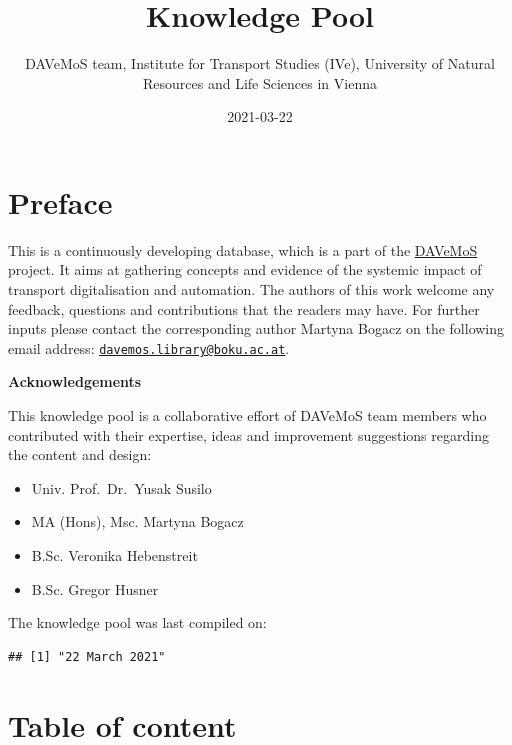 \documentclass[
]{book}
\title{Knowledge Pool}
\author{DAVeMoS team, Institute for Transport Studies (IVe), University of Natural Resources and Life Sciences in Vienna}
\date{2021-03-22}
\providecommand{\tightlist}{%
  \setlength{\itemsep}{0pt}\setlength{\parskip}{0pt}}
\begin{document}
\maketitle

{
\setcounter{tocdepth}{1}
\tableofcontents
}
\hypertarget{preface}{%
\chapter*{Preface}\label{preface}}

This is a continuously developing database, which is a part of the \href{https://www.davemos.online/}{DAVeMoS} project. It aims at gathering concepts and evidence of the systemic impact of transport digitalisation and automation. The authors of this work welcome any feedback, questions and contributions that the readers may have. For further inputs please contact the corresponding author Martyna Bogacz on the following email address: \href{mailto:davemos.library@boku.ac.at}{\nolinkurl{davemos.library@boku.ac.at}}.

\textbf{Acknowledgements}

This knowledge pool is a collaborative effort of DAVeMoS team members who contributed with their expertise, ideas and improvement suggestions regarding the content and design:

\begin{itemize}
\tightlist
\item
  Univ. Prof.~Dr.~Yusak Susilo
\item
  MA (Hons), Msc. Martyna Bogacz
\item
  B.Sc. Veronika Hebenstreit
\item
  B.Sc. Gregor Husner
\end{itemize}

The knowledge pool was last compiled on:

\begin{verbatim}
## [1] "22 March 2021"
\end{verbatim}

\hypertarget{table-of-content}{%
\chapter*{Table of content}\label{table-of-content}}
\end{document}
